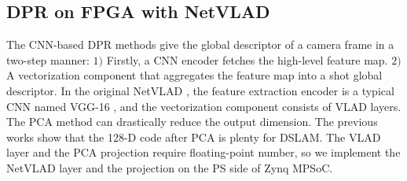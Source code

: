





\subsection{DPR on FPGA with NetVLAD}


The CNN-based DPR methods give the global descriptor of a camera frame in a two-step manner: $1)$ Firstly, a CNN encoder fetches the high-level feature map. $2)$ A vectorization component that aggregates the feature map into a shot global descriptor.
In the original NetVLAD \cite{Arandjelovic:2017997}, the feature extraction encoder is a typical CNN named VGG-16 \cite{Simonyan:20143be}, and the vectorization component consists of VLAD layers.
The PCA method can drastically reduce the output dimension. The previous works \cite{Cieslewski:20187ee,Sarlin:20187ab} show that the 128-D code after PCA is plenty for DSLAM. The VLAD layer and the PCA projection require floating-point number, so we implement the NetVLAD layer and the projection on the PS side of Zynq MPSoC.

